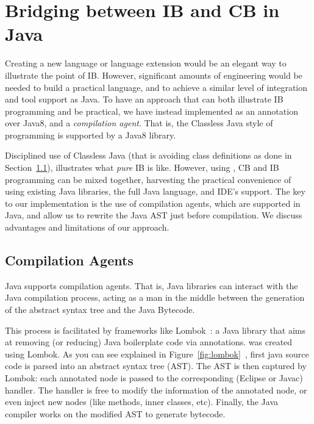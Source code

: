 \section{Bridging between IB and CB in Java}\label{sec:imp}


Creating a new language or language extension would be an
elegant way to illustrate the point of IB. However,
significant amounts of engineering would be needed to build a practical
language, and to achieve a similar level of integration and tool support
as Java. To have an approach that can both illustrate IB
programming and be practical, we have instead implemented 
\mixin as an annotation over Java8, and a \emph{compilation agent}.
That is, the Classless Java style of programming
is supported by a Java8 library.

Disciplined use of Classless Java (that is avoiding class
definitions as done in Section~\ref{}), illustrates what \emph{pure} IB is like.
However, using \mixin, CB and IB programming can be mixed together, 
harvesting the practical convenience of using existing Java libraries, the full
Java language, and IDE's support.
The key to our implementation is the use of compilation agents, which
are supported in Java, and allow us to rewrite the Java AST just
before compilation. We discuss advantages and limitations of our approach.

\subsection{Compilation Agents}
Java supports compilation agents\cite{compilationagents}.
That is, Java libraries can interact with the Java compilation process,
acting as a man in the middle between the
generation of the abstract syntax tree and the Java Bytecode.

This process is facilitated by frameworks like Lombok~\cite{lombok}:
a Java library that aims at removing (or
reducing) Java boilerplate code via
annotations. \mixin was created using Lombok.
As you can see explained in Figure~\ref{fig:lombok}~\cite{neildo2011blog},
first java source code is parsed into an abstract syntax tree (AST).
The AST is then captured by Lombok:
each annotated node is passed to
the corresponding (Eclipse or Javac) handler. The handler is
free to modify the information of the annotated node, or even inject new nodes (like methods, inner classes,
etc). Finally, the Java compiler works on the modified AST to generate bytecode.

